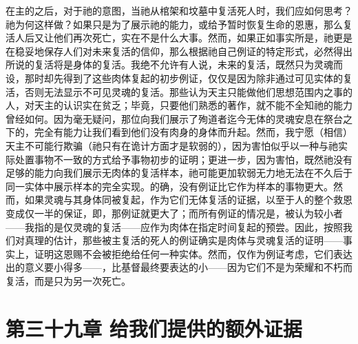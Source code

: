 在主的之后，对于祂的意图，当祂从棺架和坟墓中复活死人时，我们应如何思考？祂为何这样做？如果只是为了展示祂的能力，或给予暂时恢复生命的恩惠，那么复活人后又让他们再次死亡，实在不是什么大事。然而，如果正如事实所是，祂更是在稳妥地保存人们对未来复活的信仰，那么根据祂自己例证的特定形式，必然得出所说的复活将是身体的复活。我绝不允许有人说，未来的复活，既然只为灵魂而设，那时却先得到了这些肉体复起的初步例证，仅仅是因为除非通过可见实体的复活，否则无法显示不可见灵魂的复活。那些认为天主只能做他们思想范围内之事的人，对天主的认识实在贫乏；毕竟，只要他们熟悉的著作，就不能不全知祂的能力曾经如何。因为毫无疑问，那位向我们展示了殉道者迄今无体的灵魂安息在祭台之下的，完全有能力让我们看到他们没有肉身的身体而升起。然而，我宁愿（相信）天主不可能行欺骗（祂只有在诡计方面才是软弱的），因为害怕似乎以一种与祂实际处置事物不一致的方式给予事物初步的证明；更进一步，因为害怕，既然祂没有足够的能力向我们展示无肉体的复活样本，祂可能更加软弱无力地无法在不久后于同一实体中展示样本的完全实现。的确，没有例证比它作为样本的事物更大。然而，如果灵魂与其身体同被复起，作为它们无体复活的证据，以至于人的整个救恩变成仅一半的保证，即，那例证就更大了；而所有例证的情况是，被认为较小者——我指的是仅灵魂的复活——应作为肉体在指定时间复起的预尝。因此，按照我们对真理的估计，那些被主复活的死人的例证确实是肉体与灵魂复活的证明——事实上，证明这恩赐不会被拒绝给任何一种实体。然而，仅作为例证考虑，它们表达出的意义要小得多——，比基督最终要表达的小——因为它们不是为荣耀和不朽而复活，而是只为另一次死亡。\par


\section{第三十九章 给我们提供的额外证据}

